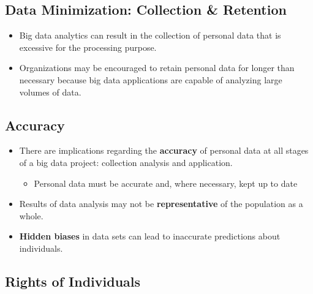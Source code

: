 \documentclass[a4paper]{article}
\begin{document}
		\subsection{Data Minimization: Collection \& Retention}
		
		\begin{itemize}
			\item Big data analytics can result in the collection of personal data that is excessive for the processing purpose.
			\item Organizations may be encouraged to retain personal data for longer than necessary because big data applications are capable of analyzing large volumes of data.
		\end{itemize}
	
		\newpage
	
		\subsection{Accuracy}
		
		\begin{itemize}
			\item There are implications regarding the \textbf{accuracy} of personal data at all stages of a big data project: collection analysis and application.
				\begin{itemize}
					\item Personal data must be accurate and, where necessary, kept up to date
				\end{itemize}
			\item Results of data analysis may not be \textbf{representative} of the population as a whole.
			\item \textbf{Hidden biases} in data sets can lead to inaccurate predictions about individuals.
		\end{itemize}
	
		\subsection{Rights of Individuals}
		
\end{document}
